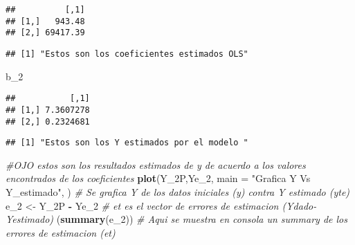\documentclass[
]{article}
\newenvironment{Shaded}{\begin{snugshade}}{\end{snugshade}}
\newcommand{\CommentTok}[1]{\textcolor[rgb]{0.56,0.35,0.01}{\textit{#1}}}
\newcommand{\DataTypeTok}[1]{\textcolor[rgb]{0.13,0.29,0.53}{#1}}
\newcommand{\DecValTok}[1]{\textcolor[rgb]{0.00,0.00,0.81}{#1}}
\newcommand{\KeywordTok}[1]{\textcolor[rgb]{0.13,0.29,0.53}{\textbf{#1}}}
\newcommand{\NormalTok}[1]{#1}
\newcommand{\OperatorTok}[1]{\textcolor[rgb]{0.81,0.36,0.00}{\textbf{#1}}}
\newcommand{\StringTok}[1]{\textcolor[rgb]{0.31,0.60,0.02}{#1}}
\begin{document}
\begin{verbatim}
##          [,1]
## [1,]   943.48
## [2,] 69417.39
\end{verbatim}

\begin{Shaded}
\end{Shaded}

\begin{verbatim}
## [1] "Estos son los coeficientes estimados OLS"
\end{verbatim}

\begin{Shaded}
\begin{Highlighting}[]
\NormalTok{b_}\DecValTok{2} 
\end{Highlighting}
\end{Shaded}

\begin{verbatim}
##           [,1]
## [1,] 7.3607278
## [2,] 0.2324681
\end{verbatim}

\begin{Shaded}
\end{Shaded}

\begin{verbatim}
## [1] "Estos son los Y estimados por el modelo "
\end{verbatim}

\begin{Shaded}
\begin{Highlighting}[]
\CommentTok{#OJO estos son los resultados estimados de y de acuerdo a los valores encontrados de los coeficientes }
\KeywordTok{plot}\NormalTok{(Y_2P,Ye_}\DecValTok{2}\NormalTok{, }\DataTypeTok{main =} \StringTok{"Grafica Y Vs Y_estimado"}\NormalTok{, )  }\CommentTok{# Se grafica Y de los datos iniciales (y)  contra Y estimado (yte)}
\NormalTok{e_}\DecValTok{2}\NormalTok{ <-}\StringTok{ }\NormalTok{Y_2P }\OperatorTok{-}\StringTok{ }\NormalTok{Ye_}\DecValTok{2}  \CommentTok{# et es el vector de errores de estimacion (Ydado-Yestimado) }
\NormalTok{(}\KeywordTok{summary}\NormalTok{(e_}\DecValTok{2}\NormalTok{))  }\CommentTok{# Aqui se muestra en consola un summary de los errores de estimacion (et)}
\end{Highlighting}
\end{Shaded}
\end{document}
